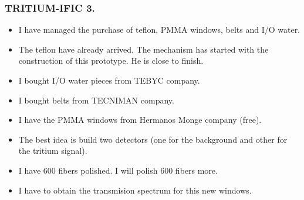 \documentclass{beamer}
\begin{document}
\begin{frame}
\frametitle{TRITIUM-IFIC 3.}

\begin{itemize}
\item{} I have managed the purchase of teflon, PMMA windows, belts and I/O water.
\item{} The teflon have already arrived. The mechanism has started with the construction of this prototype. He is close to finish.
\item{} I bought I/O water pieces from TEBYC company.
\item{} I bought belts from TECNIMAN company.
\item{} I have the PMMA windows from Hermanos Monge company (free).
\item{} The best idea is build two detectors (one for the background and other for the tritium signal).
\item{} I have 600 fibers polished. I will polish 600 fibers more.
\item{} I have to obtain the transmision spectrum for this new windows.
\end{itemize}

\end{frame}
\end{document}
